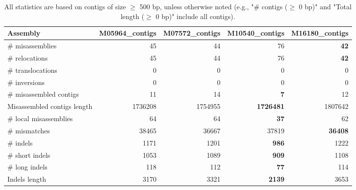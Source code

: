 \documentclass[12pt,a4paper]{article}
\begin{document}
\begin{table}[ht]
\begin{center}
\caption{All statistics are based on contigs of size $\geq$ 500 bp, unless otherwise noted (e.g., "\# contigs ($\geq$ 0 bp)" and "Total length ($\geq$ 0 bp)" include all contigs).}
\begin{tabular}{|l*{4}{|r}|}
\hline
Assembly & M05964\_contigs & M07572\_contigs & M10540\_contigs & M16180\_contigs \\ \hline
\# misassemblies & 45 & 44 & 76 & {\bf 42} \\ \hline
\hspace{5mm}\# relocations & 45 & 44 & 76 & {\bf 42} \\ \hline
\hspace{5mm}\# translocations & 0 & 0 & 0 & 0 \\ \hline
\hspace{5mm}\# inversions & 0 & 0 & 0 & 0 \\ \hline
\# misassembled contigs & 11 & 14 & {\bf 7} & 12 \\ \hline
Misassembled contigs length & 1736208 & 1754955 & {\bf 1726481} & 1807642 \\ \hline
\# local misassemblies & 64 & 64 & {\bf 37} & 62 \\ \hline
\# mismatches & 38465 & 36667 & 37819 & {\bf 36408} \\ \hline
\# indels & 1171 & 1201 & {\bf 986} & 1222 \\ \hline
\hspace{5mm}\# short indels & 1053 & 1089 & {\bf 909} & 1108 \\ \hline
\hspace{5mm}\# long indels & 118 & 112 & {\bf 77} & 114 \\ \hline
Indels length & 3170 & 3321 & {\bf 2139} & 3653 \\ \hline
\end{tabular}
\end{center}
\end{table}
\end{document}
